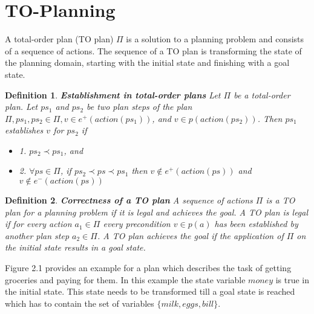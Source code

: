\section{TO-Planning}
A total-order plan (TO plan) $\Pi$ is a solution to a planning problem and consists of a sequence of actions. 
The sequence of a TO plan is transforming the state of the planning domain, starting with the initial state and finishing
with a goal state. 
\newline
\newtheorem{Definition}{
  Definition
}
\theoremstyle{definition}
\begin{Definition}
  \normalfont
  \textbf{Establishment in total-order plans}
  \textit{
  Let $\Pi$ be a total-order plan. Let $ps_1$ and $ps_2$
  be two plan steps of the plan $\Pi, ps_1, ps_2 \in \Pi, v \in e^+(action(ps_1))$, and $v \in p(action(ps_2))$.
  Then $ps_1$ establishes $v$ for $ps_2$ if
  }
\begin{itemize}
    \item \textit{1. $ps_2 \prec ps_1$, and}
    \item \textit{2. $\forall ps \in \Pi$, if $ps_2 \prec ps \prec ps_1$ then $v \notin e^+(action(ps))$ and $v \notin e^-(action(ps))$}
\end{itemize}

\end{Definition}
\begin{Definition}
  \normalfont \textbf{Correctness of a TO plan}
  \textit{A sequence of actions $\Pi$ is a TO plan for a planning problem if it is legal and achieves the goal.
  A TO plan is legal if for every action $a_1 \in \Pi$ every precondition $v \in p(a)$
  has been established by another plan step $a_2 \in \Pi$.
  A TO plan achieves the goal if the application of $\Pi$ on the initial state results in a goal state.
  }
\end{Definition}
Figure 2.1 provides an example for a plan which describes the task of getting groceries and paying for them.
In this example the state variable $money$ is true in the initial state. This state needs to be transformed till a goal state is reached which has to 
contain the set of variables $\{milk, eggs, bill\}$.

